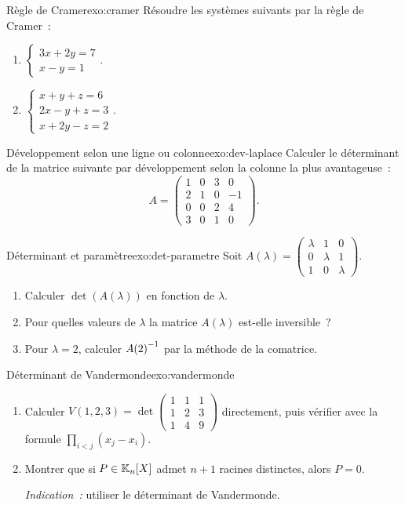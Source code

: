 \begin{exercise}{\intermediate{} Règle de Cramer}{exo:cramer}
  Résoudre les systèmes suivants par la règle de Cramer~:
  \begin{enumerate}[label=(\alph*)]
    \item $\begin{cases}3x+2y=7\\x-y=1\end{cases}$.
    \item $\begin{cases}x+y+z=6\\2x-y+z=3\\x+2y-z=2\end{cases}$.
  \end{enumerate}
\end{exercise}

\begin{exercise}{\intermediate{} Développement selon une ligne ou colonne}{exo:dev-laplace}
  Calculer le déterminant de la matrice suivante par développement selon
  la colonne la plus avantageuse~:
  \[
    A=\begin{pmatrix}1&0&3&0\\2&1&0&-1\\0&0&2&4\\3&0&1&0\end{pmatrix}.
  \]
\end{exercise}

\begin{exercise}{\intermediate{} Déterminant et paramètre}{exo:det-parametre}
  Soit $A(\lambda)=\begin{pmatrix}\lambda&1&0\\0&\lambda&1\\
  1&0&\lambda\end{pmatrix}$.
  \begin{enumerate}[label=(\alph*)]
    \item Calculer $\det(A(\lambda))$ en fonction de $\lambda$.
    \item Pour quelles valeurs de $\lambda$ la matrice $A(\lambda)$
      est-elle inversible~?
    \item Pour $\lambda=2$, calculer ${A(2)}^{-1}$ par la méthode de la
      comatrice.
  \end{enumerate}
\end{exercise}

\begin{exercise}{\intermediate{} Déterminant de Vandermonde}{exo:vandermonde}
  \begin{enumerate}[label=(\alph*)]
    \item Calculer $V(1,2,3)=\det\begin{pmatrix}1&1&1\\1&2&3\\
      1&4&9\end{pmatrix}$ directement, puis vérifier avec la formule
      $\prod_{i<j}(x_j-x_i)$.
    \item Montrer que si $P\in{\mathbb{K}}_n[X]$ admet $n+1$ racines distinctes,
      alors $P=0$.

      \emph{Indication~:} utiliser le déterminant de Vandermonde.
  \end{enumerate}
\end{exercise}

